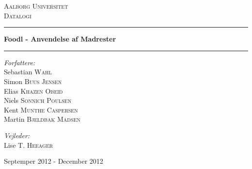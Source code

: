 \begin{titlingpage}
\centering
\vspace*{1.0cm}

\textsc{\LARGE Aalborg Universitet}\\[0.75cm]
\textsc{\Large Datalogi}\\[1.75cm]

\hrule
{ \huge \bfseries Foodl - Anvendelse af Madrester}
\vspace{0.5cm}
\hrule
\vspace{0.75cm}

  \begin{flushleft} \large
    \vspace{0pt}
    \emph{Forfattere:}\\
    Sebastian \textsc{Wahl}\\
    Simon \textsc{Buus Jensen}\\
    Elias \textsc{Khazen Obeid}\\
    Niels \textsc{Sonnich Poulsen}\\
    Kent \textsc{Munthe Caspersen}\\
    Martin \textsc{Bjeldbak Madsen}\\
  \end{flushleft}

  \begin{flushright} \large
  \vspace{-132pt}
  \emph{Vejleder:}\\
  Lise T. \textsc{Heeager}
  \end{flushright}


\vfill

{\large Septemper 2012 - December 2012}

\end{titlingpage}
